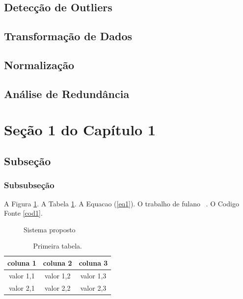 \subsection{Detecção de Outliers}
\subsection{Transformação de Dados}
\subsection{Normalização}
\subsection{Análise de Redundância}

\section{Se\c{c}\~{a}o 1 do Capítulo 1}
\subsection{Subseção}
\subsubsection{Subsubseção}

A Figura \ref{fig:sistemaProposto}. A Tabela \ref{tab:tabelaTeste}. A Equacao (\ref{eq1}). O trabalho de fulano ~\cite{ref1}. O Codigo Fonte \ref{cod1}.

\begin{figure}[htbp]	
\begin{center}
	\end{center}
	\caption{Sistema proposto}
	\label{fig:sistemaProposto}
\end{figure}

\begin{table}[htpb]
\begin{center}
\begin{tabular}{|c|c|c|}
\hline
coluna 1 & coluna 2 & coluna 3 \\
\hline
valor 1,1 & valor 1,2 & valor 1,3 \\
valor 2,1 & valor 2,2 & valor 2,3 \\
\hline
\end{tabular}
\end{center}
\caption{Primeira tabela.}
\label{tab:tabelaTeste}
\end{table}

